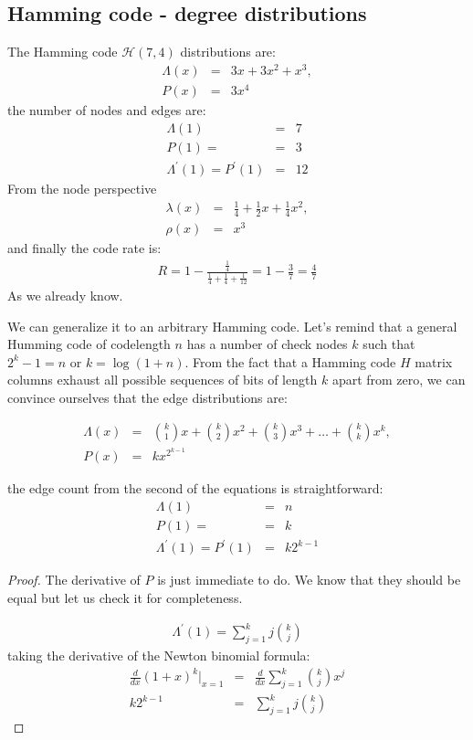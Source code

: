 \subsection{Hamming code - degree distributions}
The Hamming code $\mathcal{H}(7,4)$ distributions are:
\begin{eqnarray}
	\Lambda(x) &=& 3x+3x^2+x^3, \\
	P(x) &=& 3x^4
\end{eqnarray}
the number of nodes and edges are:
\begin{eqnarray}
 	\Lambda(1) &=& 7 \\
 	P(1) = &=& 3 \\
 	\Lambda^\prime(1) = P^\prime(1) &=& 12
\end{eqnarray}
From the node perspective
\begin{eqnarray}
\lambda(x) &=& \frac{1}{4}+\frac{1}{2}x+\frac{1}{4}x^2, \\
\rho(x) &=& x^3
\end{eqnarray}
and finally the code rate is:
\begin{eqnarray}
R = 1 - \frac{\frac{1}{4}}{\frac{1}{4} + \frac{1}{4} + \frac{1}{12}} = 1 - \frac{3}{7} = \frac{4}{7}
\end{eqnarray}
As we already know.

We can generalize it to an arbitrary Hamming code. Let's remind that a general Humming code of codelength $n$ has a number of check nodes $k$ such that $2^k-1 = n$ or $k=\log(1+n)$. From the fact that a Hamming code $H$ matrix columns exhaust all possible sequences of bits of length $k$ apart from zero, we can convince ourselves that the edge distributions are:

\begin{eqnarray}
\Lambda(x) &=& \binom{k}{1}x+\binom{k}{2}x^2+\binom{k}{3}x^3 + \dots + \binom{k}{k}x^k, \\
P(x) &=& kx^{2^{k-1}}
\end{eqnarray}

the edge count from the second of the equations is straightforward:
\begin{eqnarray}
\Lambda(1) &=& n \\
P(1) = &=& k \\
\Lambda^\prime(1) = P^\prime(1) &=& k2^{k-1} \label{eq:hammingexedgecount}
\end{eqnarray}

\begin{proof}
The derivative of $P$ is just immediate to do. We know that they should be equal but let us check it for completeness.

\begin{eqnarray}
	 \Lambda^\prime(1) = \sum_{j=1}^{k} j\binom{k}{j}
\end{eqnarray}
taking the derivative of the Newton binomial formula:
\begin{eqnarray}
\frac{d}{dx}(1+x)^k|_{x=1} &=& \frac{d}{dx}\sum_{j=1}^{k}\binom{k}{j}x^j \\
k2^{k-1} &=& \sum_{j=1}^{k} j\binom{k}{j}
\end{eqnarray}
\end{proof}

